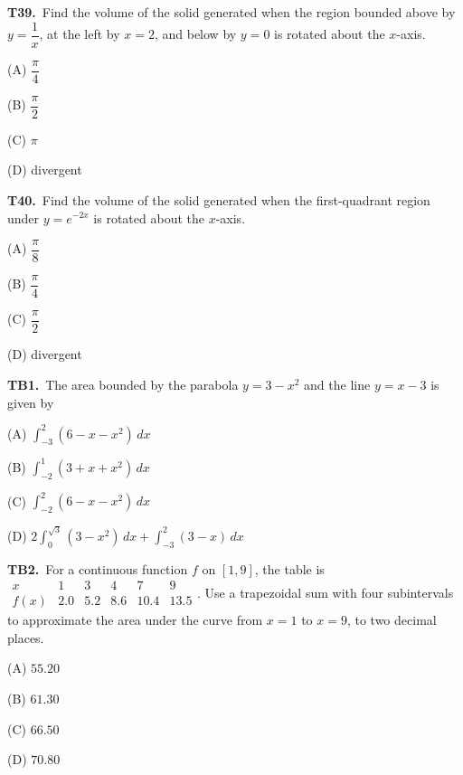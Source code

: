 \documentclass[11pt]{article}
\begin{document}
\bigskip\noindent\textbf{T39.}\ Find the volume of the solid generated when the region bounded above by $y=\dfrac{1}{x}$, at the left by $x=2$, and below by $y=0$ is rotated about the $x$-axis.
\begin{list}{}{\setlength{\leftmargin}{3em}\setlength{\labelwidth}{2.5em}\setlength{\itemsep}{0pt}\setlength{\topsep}{2pt}}
\item[(A)] $\dfrac{\pi}{4}$
\item[(B)] $\dfrac{\pi}{2}$
\item[(C)] $\pi$
\item[(D)] divergent
\end{list}

\bigskip\noindent\textbf{T40.}\ Find the volume of the solid generated when the first-quadrant region under $y=e^{-2x}$ is rotated about the $x$-axis.
\begin{list}{}{\setlength{\leftmargin}{3em}\setlength{\labelwidth}{2.5em}\setlength{\itemsep}{0pt}\setlength{\topsep}{2pt}}
\item[(A)] $\dfrac{\pi}{8}$
\item[(B)] $\dfrac{\pi}{4}$
\item[(C)] $\dfrac{\pi}{2}$
\item[(D)] divergent
\end{list}

\bigskip\noindent\textbf{TB1.}\ The area bounded by the parabola $y=3-x^2$ and the line $y=x-3$ is given by
\begin{list}{}{\setlength{\leftmargin}{3em}\setlength{\labelwidth}{2.5em}\setlength{\itemsep}{0pt}\setlength{\topsep}{2pt}}
\item[(A)] $\displaystyle\int_{-3}^{2} (6-x-x^2)\,dx$
\item[(B)] $\displaystyle\int_{-2}^{1} (3+x+x^2)\,dx$
\item[(C)] $\displaystyle\int_{-2}^{2} (6-x-x^2)\,dx$
\item[(D)] $\displaystyle 2\int_0^{\sqrt{3}} (3-x^2)\,dx + \int_{-3}^{2} (3-x)\,dx$
\end{list}

\bigskip\noindent\textbf{TB2.}\ For a continuous function $f$ on $[1,9]$, the table is $\begin{array}{c|ccccc}x&1&3&4&7&9\\\hline f(x)&2.0&5.2&8.6&10.4&13.5\end{array}$. Use a trapezoidal sum with four subintervals to approximate the area under the curve from $x=1$ to $x=9$, to two decimal places.
\begin{list}{}{\setlength{\leftmargin}{3em}\setlength{\labelwidth}{2.5em}\setlength{\itemsep}{0pt}\setlength{\topsep}{2pt}}
\item[(A)] $55.20$
\item[(B)] $61.30$
\item[(C)] $66.50$
\item[(D)] $70.80$
\end{list}
\end{document}

